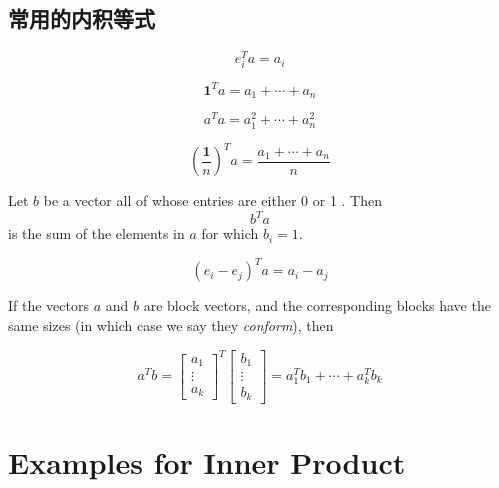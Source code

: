 \subsection{常用的内积等式}
\begin{corollary}[选出第$i$项]
    $$ e_{i}^{T} a=a_{i} $$
\end{corollary}

\begin{corollary}[向量每一项之和]
    $$ \mathbf{1}^{T} a=a_{1}+\cdots+a_{n} $$
\end{corollary}

\begin{corollary}[向量每一项的平方和]
    $$ a^{T} a=a_{1}^{2}+\cdots+a_{n}^{2} $$
\end{corollary}

\begin{corollary}[向量元素的平均值]
    $$ (\frac{\mathbf{1}}{n})^{T} a= \frac{a_{1}+\cdots+a_{n}}{n}  $$
\end{corollary}

\begin{corollary}
    Let $ b $ be a vector all of whose entries are either 0 or 1 . Then $$ b^{T} a $$ is the sum of the elements in $ a $ for which $ b_{i}=1 $.
\end{corollary}

\begin{corollary}[Differencing]
    $$ \left(e_{i}-e_{j}\right)^{T} a=a_{i}-a_{j} $$
\end{corollary}

\begin{definition}
    If the vectors $ a $ and $ b $ are block vectors, and the corresponding blocks have the same sizes (in which case we say they \textit{conform}), then 

    $$ a^{T} b=\left[\begin{array}{c}a_{1} \\ \vdots \\ a_{k}\end{array}\right]^{T}\left[\begin{array}{c}b_{1} \\ \vdots \\ b_{k}\end{array}\right]=a_{1}^{T} b_{1}+\cdots+a_{k}^{T} b_{k} $$
\end{definition}


\section{Examples for Inner Product}

